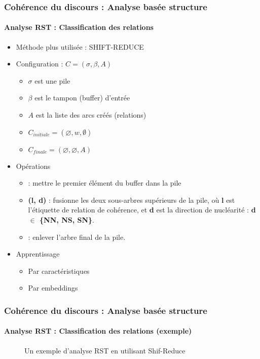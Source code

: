 \documentclass[xcolor=table]{beamer}
\begin{document}
\begin{frame}
	\frametitle{Cohérence du discours : Analyse basée structure}
	\framesubtitle{Analyse RST : Classification des relations}
	
	\begin{minipage}{.6\textwidth}
	\begin{itemize}
		\item Méthode plus utilisée : SHIFT-REDUCE
		\item Configuration : $C = (\sigma, \beta, A)$
		\begin{itemize}
			\item $\sigma$ est une pile
			\item $\beta$ est le tampon (buffer) d'entrée
			\item $A$ est la liste des arcs créés (relations)
			\item $C_{initiale} = (\varnothing, w, \emptyset)$
			\item $C_{finale} = (\varnothing, \varnothing, A)$
		\end{itemize}
	\end{itemize}
	\end{minipage}
	\begin{minipage}{.38\textwidth}
	\end{minipage}
	\begin{itemize}
		\item Opérations 
		\begin{itemize}
			\item {} : mettre le premier élément du buffer dans la pile
			\item {}\textbf{(l, d)} : fusionne les deux sous-arbres supérieurs de la pile, où \textbf{l} est l'étiquette de relation de cohérence, et \textbf{d} est la direction de nucléarité : \textbf{d $ \in $ \{NN, NS, SN\}}.
			\item {} : enlever l'arbre final de la pile.
		\end{itemize}
		\item Apprentissage 
		\begin{itemize}
			\item Par caractéristiques
			\item Par embeddings
		\end{itemize}
	\end{itemize}
	
\end{frame}

\begin{frame}
	\frametitle{Cohérence du discours : Analyse basée structure}
	\framesubtitle{Analyse RST : Classification des relations (exemple)}
	
	\begin{figure}
		
		\caption{Un exemple d'analyse RST en utilisant Shif-Reduce \cite{2018-yu-al}}
	\end{figure}
	
\end{frame}
\end{document}
